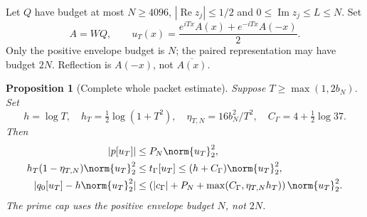 \documentclass[11pt,a4paper]{article}
\numberwithin{equation}{section}
\newtheorem{proposition}[theorem]{Proposition}
\theoremstyle{definition}\newtheorem{definition}[theorem]{Definition}
\theoremstyle{remark}\newtheorem{remark}[theorem]{Remark}
\newcommand{\tg}{t_\Gamma}\newcommand{\cg}{c_\Gamma}
\DeclareMathOperator{\Rea}{Re}\DeclareMathOperator{\Ima}{Im}
\begin{document}
Let $Q$ have budget at most $N\ge4096$,
$|\Rea z_j|\le1/2$ and $0\le\Ima z_j\le L\le N$. Set
\begin{equation}\label{gzb:eq:packet}
 A=WQ,\qquad
 u_T(x)=\frac{e^{iTx}A(x)+e^{-iTx}A(-x)}2.
\end{equation}
Only the positive envelope budget is $N$; the paired representation
may have budget $2N$. Reflection is $A(-x)$, not $\overline{A(x)}$.

\begin{proposition}[Complete whole packet estimate]\label{gzb:prop:packet}
Suppose $T\ge\max(1,2b_N)$. Set
\begin{equation}\label{gzb:eq:packet-constants}
 h=\log T,\quad h_T=\tfrac12\log(1+T^2),\quad
 \eta_{T,N}=16b_N^2/T^2,\quad C_\Gamma=4+\tfrac12\log37.
\end{equation}
Then
\begin{align}
 |p[u_T]|&\le P_N\norm{u_T}_2^2,\label{gzb:eq:packet-prime}\\
 h_T(1-\eta_{T,N})\norm{u_T}_2^2
   &\le\tg[u_T]\le(h+C_\Gamma)\norm{u_T}_2^2,\label{gzb:eq:packet-gamma}\\
 |q_0[u_T]-h\norm{u_T}_2^2|
   &\le\left(|\cg|+P_N+
      \max(C_\Gamma,\eta_{T,N}h_T)\right)\norm{u_T}_2^2.
       \label{gzb:eq:packet-error}
\end{align}
The prime cap uses the positive envelope budget $N$, not $2N$.
\end{proposition}
\end{document}
